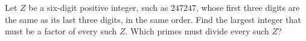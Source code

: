 Let $Z$ be a six-digit positive integer, such as $247247$, whose first three digits are the same as its last three digits, in the same order. Find the largest integer that must be a factor of every such $Z$. Which primes must divide every such $Z$?
